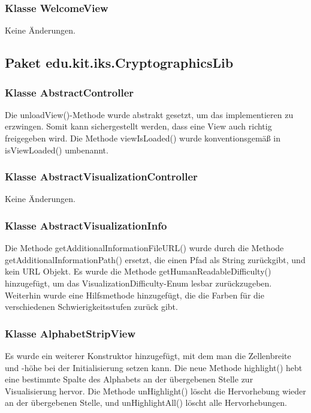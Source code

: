 \documentclass{article}
\begin{document}
    \subsubsection{Klasse WelcomeView}
      Keine Änderungen.

  \subsection{Paket edu.kit.iks.CryptographicsLib}
    
  	\subsubsection{Klasse AbstractController}
  	
  	Die unloadView()-Methode wurde abstrakt gesetzt, um das implementieren zu erzwingen.
  	Somit kann sichergestellt werden, dass eine View auch richtig freigegeben wird. Die Methode
  	viewIsLoaded() wurde konventionsgemäß in isViewLoaded() umbenannt.

	\subsubsection{Klasse AbstractVisualizationController}
  Keine Änderungen.

	\subsubsection{Klasse AbstractVisualizationInfo}

	Die Methode getAdditionalInformationFileURL() wurde durch die Methode 
	getAdditionalInformationPath() ersetzt, die einen Pfad als String zurückgibt, und kein
	URL Objekt. Es wurde die Methode getHumanReadableDifficulty() hinzugefügt, um 
	das VisualizationDifficulty-Enum lesbar zurückzugeben. Weiterhin wurde eine Hilfsmethode
  hinzugefügt, die die Farben für die verschiedenen Schwierigkeitsstufen zurück gibt.

	\subsubsection{Klasse AlphabetStripView}
	
	Es wurde ein weiterer Konstruktor hinzugefügt, mit dem man die Zellenbreite und -höhe
	bei der Initialisierung setzen kann. Die neue Methode highlight() hebt eine bestimmte
	Spalte des Alphabets an der übergebenen Stelle zur Visualisierung hervor. Die Methode 
	unHighlight() löscht die Hervorhebung wieder an der übergebenen Stelle, und unHighlightAll() 
	löscht alle Hervorhebungen.
\end{document}
